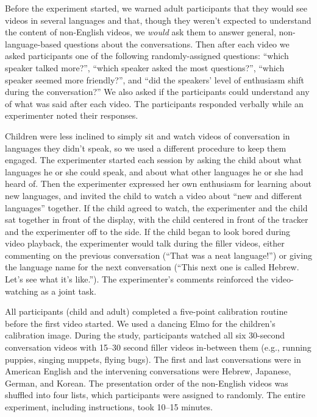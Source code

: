 \documentclass[authoryear, 12pt]{elsarticle}
\begin{document}
Before the experiment started, we warned adult participants that they would see videos in several languages and that, though they weren't expected to understand the content of non-English videos, we \textit{would} ask them to answer general, non-language-based questions about the conversations. Then after each video we asked participants one of the following randomly-assigned questions: ``which speaker talked more?'', ``which speaker asked the most questions?'', ``which speaker seemed more friendly?'', and ``did the speakers' level of enthusiasm shift during the conversation?'' We also asked if the participants could understand any of what was said after each video. The participants responded verbally while an experimenter noted their responses.

Children were less inclined to simply sit and watch videos of conversation in languages they didn't speak, so we used a different procedure to keep them engaged. The experimenter started each session by asking the child about what languages he or she could speak, and about what other languages he or she had heard of. Then the experimenter expressed her own enthusiasm for learning about new languages, and invited the child to watch a video about ``new and different languages'' together. If the child agreed to watch, the experimenter and the child sat together in front of the display, with the child centered in front of the tracker and the experimenter off to the side. If the child began to look bored during video playback, the experimenter would talk during the filler videos, either commenting on the previous conversation (``That was a neat language!'') or giving the language name for the next conversation (``This next one is called Hebrew. Let's see what it's like.''). The experimenter's comments reinforced the video-watching as a joint task.

All participants (child and adult) completed a five-point calibration routine before the first video started. We used a dancing Elmo for the children's calibration image. During the study, participants watched all six 30-second conversation videos with 15--30 second filler videos in-between them (e.g., running puppies, singing muppets, flying bugs). The first and last conversations were in American English and the intervening conversations were Hebrew, Japanese, German, and Korean. The presentation order of the non-English videos was shuffled into four lists, which participants were assigned to randomly. The entire experiment, including instructions, took 10--15 minutes.
\end{document}
